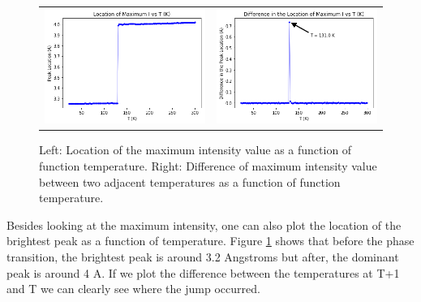 \begin{figure}[h]
\begin{tabular}{ll}
\includegraphics[scale=.4]{../poster/figs/dsmax.png}
&
\hspace{25mm}
\includegraphics[scale=0.4]{../figs/dsdiff_T.png}
\end{tabular}
\caption{Left: Location of the maximum intensity value as a function of function temperature. 
Right: Difference of maximum intensity value between two adjacent temperatures as a function of function temperature.}
\label{fig:Tmax}
\end{figure}

Besides looking at the maximum intensity, one can also plot the location of the brightest peak as a function of temperature. Figure \ref{fig:Tmax} shows that before the phase transition, the brightest peak is around 3.2 Angstroms but after, the dominant peak is around 4 A. If we plot the difference between the temperatures at T+1 and T we can clearly see where the jump occurred.